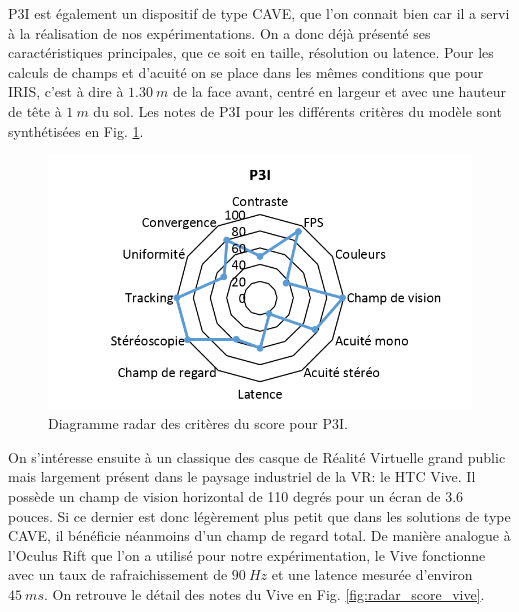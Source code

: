 \par P3I est également un dispositif de type CAVE, que l'on connait bien car il a servi à la réalisation de nos expérimentations. On a donc déjà présenté ses caractéristiques principales, que ce soit en taille, résolution ou latence. Pour les calculs de champs et d'acuité on se place dans les mêmes conditions que pour IRIS, c'est à dire à $1.30~m$ de la face avant, centré en largeur et avec une hauteur de tête à $1~m$ du sol. Les notes de P3I pour les différents critères du modèle sont synthétisées en Fig. \ref{fig:radar_score_p3i}.

\begin{figure}
	\renewcommand\thefigure{IV}
	\centering
	\includegraphics[scale=1]{Figures/RadarScoreP3I}
	\caption{Diagramme radar des critères du score pour P3I.}
	\label{fig:radar_score_p3i}
\end{figure}

\par On s'intéresse ensuite à un classique des casque de Réalité Virtuelle grand public mais largement présent dans le paysage industriel de la VR: le HTC Vive. Il possède un champ de vision horizontal de 110 degrés pour un écran de 3.6 pouces. Si ce dernier est donc légèrement plus petit que dans les solutions de type CAVE, il bénéficie néanmoins d'un champ de regard total. De manière analogue à l'Oculus Rift que l'on a utilisé pour notre expérimentation, le Vive fonctionne avec un taux de rafraichissement de $90~Hz$ et une latence mesurée d'environ $45~ms$. On retrouve le détail des notes du Vive en Fig. \ref{fig:radar_score_vive}.

